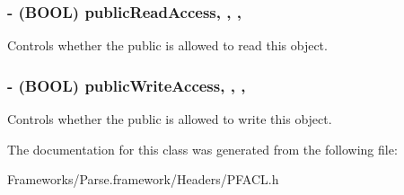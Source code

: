 \subsubsection[{public\+Read\+Access}]{\setlength{\rightskip}{0pt plus 5cm}-\/ (B\+O\+O\+L) public\+Read\+Access\hspace{0.3cm}{\ttfamily [read]}, {\ttfamily [write]}, {\ttfamily [nonatomic]}, {\ttfamily [assign]}}\label{interface_p_f_a_c_l_a768ec3bf7b44328eeba1f77a77bd5556}




 





Controls whether the public is allowed to read this object. \hypertarget{interface_p_f_a_c_l_add1e5b03c98b8b21cb7f643422294891}{}
\subsubsection[{public\+Write\+Access}]{\setlength{\rightskip}{0pt plus 5cm}-\/ (B\+O\+O\+L) public\+Write\+Access\hspace{0.3cm}{\ttfamily [read]}, {\ttfamily [write]}, {\ttfamily [nonatomic]}, {\ttfamily [assign]}}\label{interface_p_f_a_c_l_add1e5b03c98b8b21cb7f643422294891}
Controls whether the public is allowed to write this object. 

The documentation for this class was generated from the following file\+:\begin{DoxyCompactItemize}
\item 
Frameworks/\+Parse.\+framework/\+Headers/P\+F\+A\+C\+L.\+h\end{DoxyCompactItemize}
